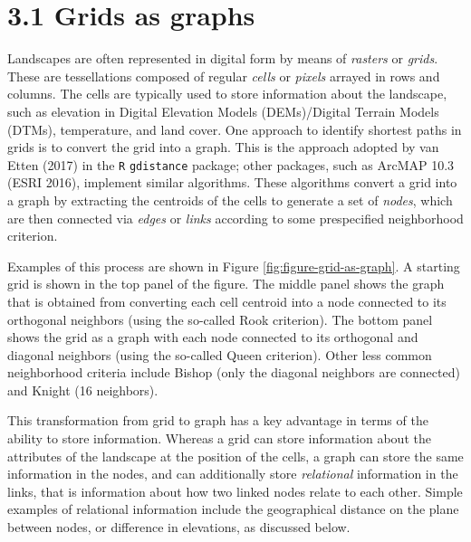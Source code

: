 \documentclass[]{elsarticle} %
\begin{document}
\hypertarget{grids-as-graphs}{%
\section{3.1 Grids as graphs}\label{grids-as-graphs}}

Landscapes are often represented in digital form by means of
\emph{rasters} or \emph{grids}. These are tessellations composed of
regular \emph{cells} or \emph{pixels} arrayed in rows and columns. The
cells are typically used to store information about the landscape, such
as elevation in Digital Elevation Models (DEMs)/Digital Terrain Models
(DTMs), temperature, and land cover. One approach to identify shortest
paths in grids is to convert the grid into a graph. This is the approach
adopted by van Etten (2017) in the \texttt{R} \texttt{gdistance}
package; other packages, such as ArcMAP 10.3 (ESRI 2016), implement
similar algorithms. These algorithms convert a grid into a graph by
extracting the centroids of the cells to generate a set of \emph{nodes},
which are then connected via \emph{edges} or \emph{links} according to
some prespecified neighborhood criterion.

Examples of this process are shown in Figure
\ref{fig:figure-grid-as-graph}. A starting grid is shown in the top
panel of the figure. The middle panel shows the graph that is obtained
from converting each cell centroid into a node connected to its
orthogonal neighbors (using the so-called Rook criterion). The bottom
panel shows the grid as a graph with each node connected to its
orthogonal and diagonal neighbors (using the so-called Queen criterion).
Other less common neighborhood criteria include Bishop (only the
diagonal neighbors are connected) and Knight (16 neighbors).

This transformation from grid to graph has a key advantage in terms of
the ability to store information. Whereas a grid can store information
about the attributes of the landscape at the position of the cells, a
graph can store the same information in the nodes, and can additionally
store \emph{relational} information in the links, that is information
about how two linked nodes relate to each other. Simple examples of
relational information include the geographical distance on the plane
between nodes, or difference in elevations, as discussed below.
\end{document}
